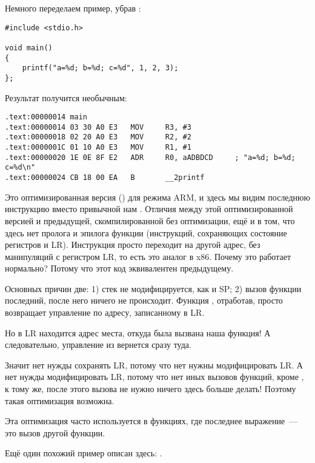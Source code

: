 Немного переделаем пример, убрав :

\begin{lstlisting}
#include <stdio.h>

void main()
{
	printf("a=%d; b=%d; c=%d", 1, 2, 3);
};
\end{lstlisting}

Результат получится необычным:

\begin{lstlisting}[caption=\OptimizingKeilVI (\ARMMode)]
.text:00000014 main
.text:00000014 03 30 A0 E3   MOV     R3, #3
.text:00000018 02 20 A0 E3   MOV     R2, #2
.text:0000001C 01 10 A0 E3   MOV     R1, #1
.text:00000020 1E 0E 8F E2   ADR     R0, aADBDCD     ; "a=%d; b=%d; c=%d\n"
.text:00000024 CB 18 00 EA   B       __2printf
\end{lstlisting}

Это оптимизированная версия (\Othree) для режима ARM, и здесь мы видим последнюю инструкцию 
 вместо привычной нам .
Отличия между этой оптимизированной версией и предыдущей, скомпилированной без оптимизации, 
ещё и в том, что здесь нет пролога и эпилога функции (инструкций, сохраняющих состояние регистров  и \ac{LR}).
Инструкция  просто переходит на другой адрес, без манипуляций с регистром \ac{LR}, то есть это аналог \JMP в x86.
Почему это работает нормально? Потому что этот код эквивалентен предыдущему.

Основных причин две: 1) стек не модифицируется, как и  \ac{SP}; 2) вызов функции \printf последний, после него ничего не происходит.
Функция \printf, отработав, просто возвращает управление по адресу, записанному в \ac{LR}.

Но в \ac{LR} находится адрес места, откуда была вызвана наша функция!
А следовательно, управление из \printf вернется сразу туда.

Значит нет нужды сохранять \ac{LR}, потому что нет нужны модифицировать \ac{LR}.
А нет нужды модифицировать \ac{LR}, потому что нет иных вызовов функций, кроме \printf, к тому же, после этого вызова не нужно ничего здесь больше делать!
Поэтому такая оптимизация возможна.

Эта оптимизация часто используется в функциях, где последнее выражение~--- это вызов другой функции.

Ещё один похожий пример описан здесь:
.

